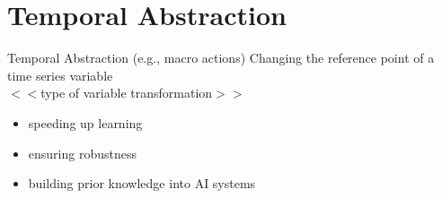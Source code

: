 \section{Temporal Abstraction}

\begin{frame}{Temporal Abstraction (e.g., macro actions)}
    Changing the reference point of a time series variable \\
    $<<$type of variable transformation$>>$
    \begin{itemize}
        \item speeding up learning
        \item ensuring robustness
        \item building prior knowledge into AI systems
    \end{itemize}
    
\end{frame}